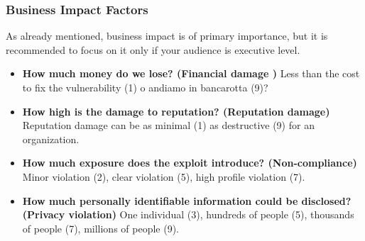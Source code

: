 \subsubsection{Business Impact Factors}
As already mentioned, business impact is of primary importance, but it is recommended to focus on it only if your audience is executive level.
\begin{itemize}
    \itemsep0em
    \item \textbf{How much money do we lose? (Financial damage )} Less than the cost to fix the vulnerability (1) o andiamo in bancarotta (9)?
    \item \textbf{How high is the damage to reputation? (Reputation damage)} Reputation damage can be as minimal (1) as destructive (9) for an organization.
    \item \textbf{How much exposure does the exploit introduce? (Non-compliance)} Minor violation (2), clear violation (5), high profile violation (7).
    \item \textbf{How much personally identifiable information could be disclosed? (Privacy violation)} One individual (3), hundreds of people (5), thousands of people (7), millions of people (9).
\end{itemize}
